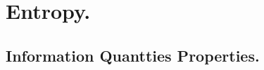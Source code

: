 \documentclass[12pt,a4paper]{article}
\begin{document}
%

\section{Entropy.}

\subsection{Information Quantties Properties. } 
\end{document}
